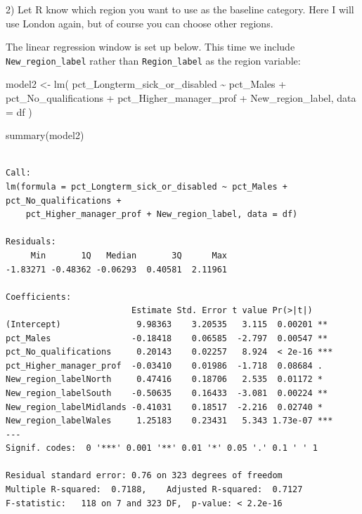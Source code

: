 \documentclass[
  letterpaper,
  DIV=11,
  numbers=noendperiod]{scrreprt}
\newenvironment{Shaded}{\begin{snugshade}}{\end{snugshade}}
\newcommand{\AttributeTok}[1]{\textcolor[rgb]{0.40,0.45,0.13}{#1}}
\newcommand{\FunctionTok}[1]{\textcolor[rgb]{0.28,0.35,0.67}{#1}}
\newcommand{\NormalTok}[1]{\textcolor[rgb]{0.00,0.23,0.31}{#1}}
\newcommand{\OtherTok}[1]{\textcolor[rgb]{0.00,0.23,0.31}{#1}}
\newcommand{\SpecialCharTok}[1]{\textcolor[rgb]{0.37,0.37,0.37}{#1}}
\newcommand{\StringTok}[1]{\textcolor[rgb]{0.13,0.47,0.30}{#1}}
\begin{document}
2) Let R know which region you want to use as the baseline category.
Here I will use London again, but of course you can choose other
regions.

\begin{Shaded}
\end{Shaded}

The linear regression window is set up below. This time we include
\texttt{New\_region\_label} rather than \texttt{Region\_label} as the
region variable:

\begin{Shaded}
\begin{Highlighting}[]
\NormalTok{model2 }\OtherTok{\textless{}{-}} \FunctionTok{lm}\NormalTok{(}
\NormalTok{  pct\_Longterm\_sick\_or\_disabled }\SpecialCharTok{\textasciitilde{}}\NormalTok{ pct\_Males }\SpecialCharTok{+}\NormalTok{ pct\_No\_qualifications }\SpecialCharTok{+}\NormalTok{ pct\_Higher\_manager\_prof }\SpecialCharTok{+}\NormalTok{ New\_region\_label,}
  \AttributeTok{data =}\NormalTok{ df}
\NormalTok{)}

\FunctionTok{summary}\NormalTok{(model2)}
\end{Highlighting}
\end{Shaded}

\begin{verbatim}

Call:
lm(formula = pct_Longterm_sick_or_disabled ~ pct_Males + pct_No_qualifications + 
    pct_Higher_manager_prof + New_region_label, data = df)

Residuals:
     Min       1Q   Median       3Q      Max 
-1.83271 -0.48362 -0.06293  0.40581  2.11961 

Coefficients:
                         Estimate Std. Error t value Pr(>|t|)    
(Intercept)               9.98363    3.20535   3.115  0.00201 ** 
pct_Males                -0.18418    0.06585  -2.797  0.00547 ** 
pct_No_qualifications     0.20143    0.02257   8.924  < 2e-16 ***
pct_Higher_manager_prof  -0.03410    0.01986  -1.718  0.08684 .  
New_region_labelNorth     0.47416    0.18706   2.535  0.01172 *  
New_region_labelSouth    -0.50635    0.16433  -3.081  0.00224 ** 
New_region_labelMidlands -0.41031    0.18517  -2.216  0.02740 *  
New_region_labelWales     1.25183    0.23431   5.343 1.73e-07 ***
---
Signif. codes:  0 '***' 0.001 '**' 0.01 '*' 0.05 '.' 0.1 ' ' 1

Residual standard error: 0.76 on 323 degrees of freedom
Multiple R-squared:  0.7188,    Adjusted R-squared:  0.7127 
F-statistic:   118 on 7 and 323 DF,  p-value: < 2.2e-16
\end{verbatim}
\end{document}
